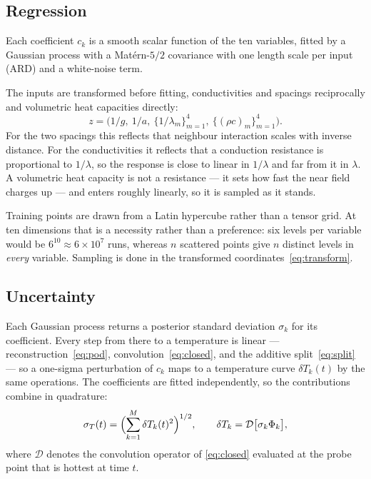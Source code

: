 \documentclass[11pt,a4paper]{article}
\theoremstyle{plain}
\begin{document}
\subsection{Regression}

Each coefficient $c_k$ is a smooth scalar function of the ten variables, fitted
by a Gaussian process with a Matérn-$5/2$ covariance with one length scale per
input (ARD) and a white-noise term.

The inputs are transformed before fitting, conductivities and spacings
reciprocally and volumetric heat capacities directly:
\begin{equation}
  z = \bigl(1/g,\ 1/a,\ \{1/\lambda_m\}_{m=1}^{4},\ \{(\rho c)_m\}_{m=1}^{4}\bigr).
  \label{eq:transform}
\end{equation}
For the two spacings this reflects that neighbour interaction scales with
inverse distance. For the conductivities it reflects that a conduction
resistance is proportional to $1/\lambda$, so the response is close to linear
in $1/\lambda$ and far from it in $\lambda$. A volumetric heat capacity is not
a resistance --- it sets how fast the near field charges up --- and enters
roughly linearly, so it is sampled as it stands.

Training points are drawn from a Latin hypercube rather than a tensor grid. At
ten dimensions that is a necessity rather than a preference: six levels per
variable would be $6^{10} \approx 6 \times 10^{7}$ runs, whereas $n$ scattered
points give $n$ distinct levels in \emph{every} variable. Sampling is done in
the transformed coordinates~\eqref{eq:transform}.

\subsection{Uncertainty}

Each Gaussian process returns a posterior standard deviation $\sigma_k$ for its
coefficient. Every step from there to a temperature is linear ---
reconstruction~\eqref{eq:pod}, convolution~\eqref{eq:closed}, and the additive
split~\eqref{eq:split} --- so a one-sigma perturbation of $c_k$ maps to a
temperature curve $\delta T_k(t)$ by the same operations. The coefficients are
fitted independently, so the contributions combine in quadrature:
\begin{equation}
  \sigma_T(t) = \Bigl( \sum_{k=1}^{M} \delta T_k(t)^2 \Bigr)^{1/2},
  \qquad
  \delta T_k = \mathcal{D}\bigl[\sigma_k \Phi_k\bigr],
  \label{eq:sigma}
\end{equation}
where $\mathcal{D}$ denotes the convolution operator of \eqref{eq:closed}
evaluated at the probe point that is hottest at time $t$.
\end{document}
